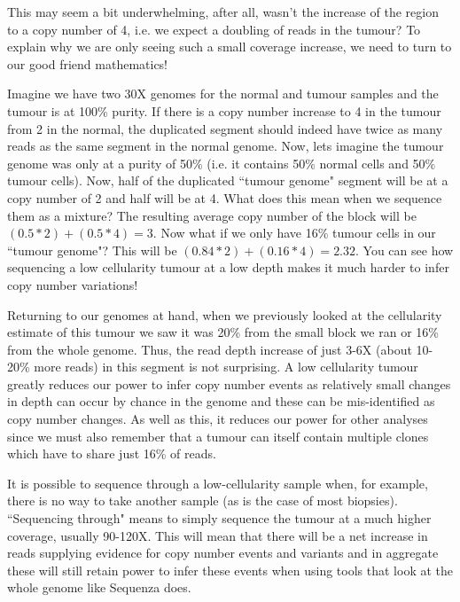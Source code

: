This may seem a bit underwhelming, after all, wasn't the increase of the region to a copy number of 4, i.e. we expect a doubling of reads in the tumour? To explain why we are only seeing such a small coverage increase, we need to turn to our good friend mathematics!

Imagine we have two 30X genomes for the normal and tumour samples and the tumour is at 100\% purity. If there is a copy number increase to 4 in the tumour from 2 in the normal, the duplicated segment should indeed have twice as many reads as the same segment in the normal genome. Now, lets imagine the tumour genome was only at a purity of 50\% (i.e. it contains 50\% normal cells and 50\% tumour cells). Now, half of the duplicated ``tumour genome" segment will be at a copy number of 2 and half will be at 4. What does this mean when we sequence them as a mixture? The resulting average copy number of the block will be $(0.5*2)+(0.5*4) = 3$. Now what if we only have 16\% tumour cells in our ``tumour genome"? This will be $(0.84*2)+(0.16*4) = 2.32$. You can see how sequencing a low cellularity tumour at a low depth makes it much harder to infer copy number variations!

Returning to our genomes at hand, when we previously looked at the cellularity estimate of this tumour we saw it was 20\% from the small block we ran or 16\% from the whole genome. Thus, the read depth increase of just 3-6X (about 10-20\% more reads) in this segment is not surprising. A low cellularity tumour greatly reduces our power to infer copy number events as relatively small changes in depth can occur by chance in the genome and these can be mis-identified as copy number changes. As well as this, it reduces our power for other analyses since we must also remember that a tumour can itself contain multiple clones which have to share just 16\% of reads.\\

\begin{note}
It is possible to sequence through a low-cellularity sample when, for example, there is no way to take another sample (as is the case of most biopsies). ``Sequencing through" means to simply sequence the tumour at a much higher coverage, usually 90-120X. This will mean that there will be a net increase in reads supplying evidence for copy number events and variants and in aggregate these will still retain power to infer these events when using tools that look at the whole genome like Sequenza does.
\end{note}


